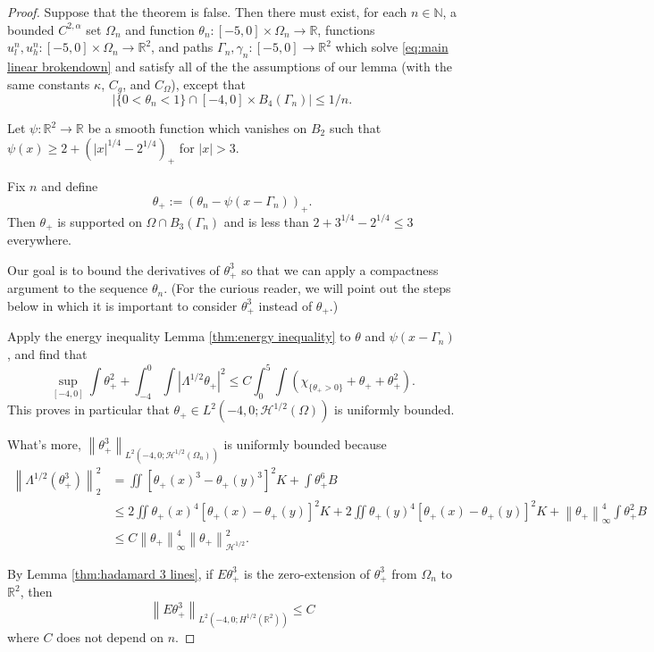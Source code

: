 \documentclass[11pt]{amsart}
\theoremstyle{remark}
\theoremstyle{definition}
\newcommand{\R}{\mathbb{R}}
\newcommand{\N}{\mathbb{N}}
\newcommand{\norm}[1]{\left\lVert#1\right\rVert}
\newcommand{\paren}[1]{\left( #1 \right)}
\newcommand{\abs}[1]{\left\lvert #1 \right\rvert}
\newcommand{\indic}[1]{\chi_{\{#1\}}}
\newcommand{\ulow}{u_l}
\newcommand{\uhigh}{u_h}
\newcommand{\HD}{\mathcal{H}}
\newcommand{\Cgamma}{C_g}
\newcommand{\Comega}{C_\Omega}
\newcounter{step_count}[section]
\begin{document}
\begin{proof}
Suppose that the theorem is false.  Then there must exist, for each $n \in \N$, a bounded $C^{2,\alpha}$ set $\Omega_n$ and function $\theta_n: [-5,0]\times \Omega_n \to \R$, functions $\ulow^n, \uhigh^n: [-5,0]\times\Omega_n \to \R^2$, and paths $\Gamma_n,\gamma_n:[-5,0]\to\R^2$ which solve \eqref{eq:main linear brokendown} and satisfy all of the the assumptions of our lemma (with the same constants $\kappa$, $\Cgamma$, and $\Comega$), except that
\[ \abs{\{0 < \theta_n < 1\} \cap [-4,0]\times B_4(\Gamma_n)} \leq 1/n. \]

Let $\psi:\R^2 \to \R$ be a smooth function which vanishes on $B_2$ such that $\psi(x) \geq 2 + \paren{|x|^{1/4}-2^{1/4}}_+$ for $|x|>3$.  

Fix $n$ and define 
\[ \theta_+ := \paren{\theta_n - \psi(x-\Gamma_n)}_+. \]
Then $\theta_+$ is supported on $\Omega \cap B_3(\Gamma_n)$ and is less than $2 + 3^{1/4} - 2^{1/4} \leq 3$ everywhere.  

Our goal is to bound the derivatives of $\theta_+^3$ so that we can apply a compactness argument to the sequence $\theta_n$.  (For the curious reader, we will point out the steps below in which it is important to consider $\theta_+^3$ instead of $\theta_+$.)  

Apply the energy inequality Lemma \ref{thm:energy inequality} to $\theta$ and $\psi(x-\Gamma_n)$, and find that
\[ \sup_{[-4,0]} \int \theta_+^2 + \int_{-4}^0 \int \abs{\Lambda^{1/2}\theta_+}^2 \leq C \int_0^5 \int \paren{\indic{\theta_+>0} + \theta_+ + \theta_+^2}. \]
This proves in particular that $\theta_+ \in L^2(-4,0; \HD^{1/2}(\Omega))$ is uniformly bounded.  

What's more, $\norm{\theta_+^3}_{L^2(-4,0;\HD^{1/2}(\Omega_n))}$ is uniformly bounded because
\begin{align*} 
\norm{\Lambda^{1/2}(\theta_+^3)}_2^2 &= \iint [\theta_+(x)^3 - \theta_+(y)^3]^2 K + \int \theta_+^6 B 
\\ &\leq 2\iint \theta_+(x)^4 [\theta_+(x)-\theta_+(y)]^2 K + 2\iint \theta_+(y)^4[\theta_+(x)-\theta_+(y)]^2 K + \norm{\theta_+}_\infty^4 \int \theta_+^2 B
\\ &\leq C \norm{\theta_+}_\infty^4 \norm{\theta_+}_{\HD^{1/2}}^2.  
\end{align*}

By Lemma \ref{thm:hadamard 3 lines}, if $E \theta_+^3$ is the zero-extension of $\theta_+^3$ from $\Omega_n$ to $\R^2$, then
\[ \norm{ E \theta_+^3}_{L^2(-4,0; H^{1/2}(\R^2))} \leq C \]
where $C$ does not depend on $n$.  


\end{proof}
\end{document}
